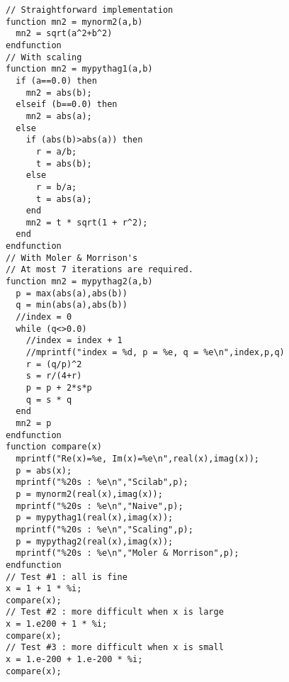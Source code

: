 \lstset{language=scilabscript}
\begin{lstlisting}
// Straightforward implementation
function mn2 = mynorm2(a,b)
  mn2 = sqrt(a^2+b^2)
endfunction
// With scaling
function mn2 = mypythag1(a,b)
  if (a==0.0) then
    mn2 = abs(b);
  elseif (b==0.0) then
    mn2 = abs(a);
  else
    if (abs(b)>abs(a)) then
      r = a/b;
      t = abs(b);
    else
      r = b/a;
      t = abs(a);
    end
    mn2 = t * sqrt(1 + r^2);
  end
endfunction
// With Moler & Morrison's
// At most 7 iterations are required.
function mn2 = mypythag2(a,b)
  p = max(abs(a),abs(b))
  q = min(abs(a),abs(b))
  //index = 0
  while (q<>0.0)
    //index = index + 1
    //mprintf("index = %d, p = %e, q = %e\n",index,p,q)
    r = (q/p)^2
    s = r/(4+r)
    p = p + 2*s*p
    q = s * q
  end
  mn2 = p
endfunction
function compare(x)
  mprintf("Re(x)=%e, Im(x)=%e\n",real(x),imag(x));
  p = abs(x);
  mprintf("%20s : %e\n","Scilab",p);
  p = mynorm2(real(x),imag(x));
  mprintf("%20s : %e\n","Naive",p);
  p = mypythag1(real(x),imag(x));
  mprintf("%20s : %e\n","Scaling",p);
  p = mypythag2(real(x),imag(x));
  mprintf("%20s : %e\n","Moler & Morrison",p);
endfunction
// Test #1 : all is fine
x = 1 + 1 * %i;
compare(x);
// Test #2 : more difficult when x is large
x = 1.e200 + 1 * %i;
compare(x);
// Test #3 : more difficult when x is small
x = 1.e-200 + 1.e-200 * %i;
compare(x);
\end{lstlisting}

